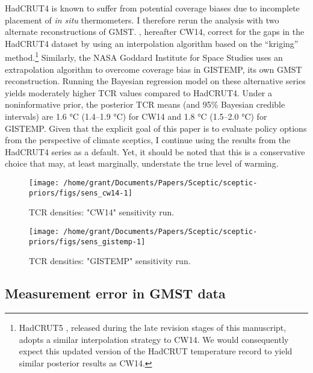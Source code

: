 \documentclass[
]{article}
\begin{document}
HadCRUT4 is known to suffer from potential coverage biases due to
incomplete placement of \textit{in situ} thermometers. I therefore rerun
the analysis with two alternate reconstructions of GMST.
\cite{cowtan2014coverage}, hereafter CW14, correct for the gaps in the
HadCRUT4 dataset by using an interpolation algorithm based on the
``kriging'' method.\footnote{HadCRUT5 \citep{morice2020hadcrut5},
  released during the late revision stages of this manuscript, adopts a
  similar interpolation strategy to CW14. We would consequently expect
  this updated version of the HadCRUT temperature record to yield
  similar posterior results as CW14.} Similarly, the NASA Goddard
Institute for Space Studies uses an extrapolation algorithm to overcome
coverage bias in GISTEMP, its own GMST reconstruction. Running the
Bayesian regression model on these alternative series yields moderately
higher TCR values compared to HadCRUT4. Under a noninformative prior,
the posterior TCR means (and 95\% Bayesian credible intervals) are 1.6
°C (1.4--1.9 °C) for CW14 and 1.8 °C (1.5--2.0 °C) for GISTEMP. Given
that the explicit goal of this paper is to evaluate policy options from
the perspective of climate sceptics, I continue using the results from
the HadCRUT4 series as a default. Yet, it should be noted that this is a
conservative choice that may, at least marginally, understate the true
level of warming.

\begin{figure}[H]

{\centering \texttt{[image: /home/grant/Documents/Papers/Sceptic/sceptic-priors/figs/sens\_cw14-1]} 

}

\caption{TCR densities: "CW14" sensitivity run.}\label{fig:sens_cw14}
\end{figure}

\begin{figure}[H]

{\centering \texttt{[image: /home/grant/Documents/Papers/Sceptic/sceptic-priors/figs/sens\_gistemp-1]} 

}

\caption{TCR densities: "GISTEMP" sensitivity run.}\label{fig:sens_gistemp}
\end{figure}

\newpage
\pagebreak

\hypertarget{measurement-error-in-gmst-data}{%
\subsection{Measurement error in GMST
data}\label{measurement-error-in-gmst-data}}
\end{document}
